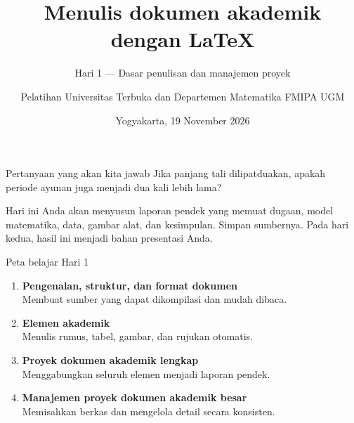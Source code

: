 \documentclass[aspectratio=169,11pt]{beamer}
\title{Menulis dokumen akademik dengan \LaTeX}
\subtitle{Hari 1 --- Dasar penulisan dan manajemen proyek}
\author{Pelatihan Universitas Terbuka dan Departemen Matematika FMIPA UGM}
\date{Yogyakarta, 19 November 2026}
\begin{document}
\begin{frame}[plain]
\inserttitle\par
{}\insertsubtitle\par\medskip
{}\par\medskip
{}\insertauthor\par\smallskip
{}\insertdate
\end{frame}
\begin{frame}[fragile]{Pertanyaan yang akan kita jawab}
Jika panjang tali dilipatduakan, apakah periode ayunan juga menjadi dua kali lebih lama?
\medskip

Hari ini Anda akan menyusun laporan pendek yang memuat dugaan, model matematika, data, gambar alat, dan kesimpulan. Simpan sumbernya. Pada hari kedua, hasil ini menjadi bahan presentasi Anda.
\end{frame}
\begin{frame}{Peta belajar Hari 1}
\begin{enumerate}
\item \textbf{Pengenalan, struktur, dan format dokumen}\\
Membuat sumber yang dapat dikompilasi dan mudah dibaca.
\item \textbf{Elemen akademik}\\
Menulis rumus, tabel, gambar, dan rujukan otomatis.
\item \textbf{Proyek dokumen akademik lengkap}\\
Menggabungkan seluruh elemen menjadi laporan pendek.
\item \textbf{Manajemen proyek dokumen akademik besar}\\
Memisahkan berkas dan mengelola detail secara konsisten.
\end{enumerate}
\end{frame}
\end{document}
